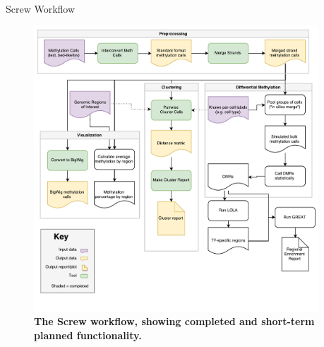 \documentclass{beamer}
\begin{document}
\begin{frame}
\begin{columns}[t]
\begin{column}{.65\textwidth}
\begin{columns}[t,totalwidth=\textwidth]
	\begin{column}{.48\textwidth}
	
	\end{column}
  \end{columns}

	\begin{block}{Screw Workflow}
	\begin{figure}
	\begin{center}
  \includegraphics[width=0.95\textwidth]{figures/workflow_diagram.pdf}
  \end{center} 
  \caption{\textbf{The Screw workflow, showing completed and short-term planned functionality.} }
  \end{figure}
  \end{block}
  \begin{columns}[t,totalwidth=\textwidth]


\begin{column}{.48\textwidth}
   


\end{column}
\end{columns}
\end{column}
\end{columns}
\end{frame}
\end{document}

